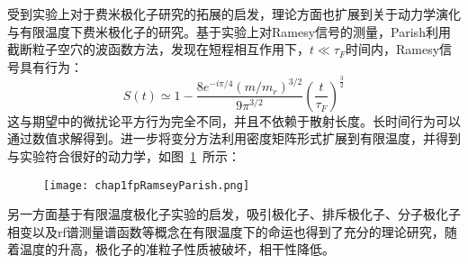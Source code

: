 受到实验上对于费米极化子研究的拓展的启发，理论方面也扩展到关于动力学演化与有限温度下费米极化子的研究。基于实验上对Ramesy信号的测量，Parish利用截断粒子空穴的波函数方法\cite{Parish2016quantum}，发现在短程相互作用下，$t\ll \tau_F$时间内，Ramesy信号具有行为：
\begin{equation}
S(t) \simeq 1-\frac{8 e^{-i \pi / 4}\left(m / m_{r}\right)^{3 / 2}}{9 \pi^{3 / 2}}\left(\frac{t}{\tau_{F}}\right)^{\frac{3}{2}}
\end{equation}
这与期望中的微扰论平方行为完全不同，并且不依赖于散射长度。长时间行为可以通过数值求解得到。进一步将变分方法利用密度矩阵形式扩展到有限温度，并得到与实验\cite{cetina2016ultrafast}符合很好的动力学\cite{Liu2019variational}，如图~\ref{RamseyParish}~所示：
\begin{figure}[!htbp]
    \centering
    \texttt{[image: chap1fpRamseyParish.png]}
    \label{RamseyParish}
\end{figure}


另一方面基于有限温度极化子实验的启发\cite{YanBoiling}，吸引极化子、排斥极化子、分子极化子相变以及rf谱测量谱函数等概念在有限温度下的命运也得到了充分的理论研究，随着温度的升高，极化子的准粒子性质被破坏，相干性降低\cite{tajima2018many,Hu2018attractive,mulkerin2019breakdown,Taylor2019thermal,Liu2020Radio,Liu2020theory,Parish2021thermodynamic}。










